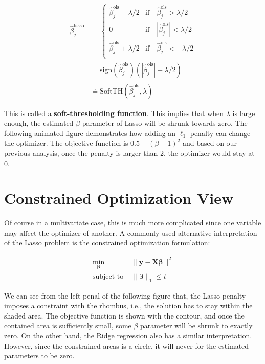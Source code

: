 \documentclass[
]{book}
\theoremstyle{definition}
\theoremstyle{definition}
\theoremstyle{definition}
\theoremstyle{definition}
\theoremstyle{remark}
\begin{document}
\begin{align}
\hat\beta_j^\text{lasso} &=
        \begin{cases}
        \hat\beta_j^\text{ols} - \lambda/2 & \text{if} \quad \hat\beta_j^\text{ols} > \lambda/2 \\
        0 & \text{if} \quad |\hat\beta_j^\text{ols}| < \lambda/2 \\
        \hat\beta_j^\text{ols} + \lambda/2 & \text{if} \quad \hat\beta_j^\text{ols} < -\lambda/2 \\
        \end{cases}\\
        &= \text{sign}(\hat\beta_j^\text{ols}) \left(|\hat\beta_j^\text{ols}| - \lambda/2 \right)_+ \\
        &\doteq \text{SoftTH}(\hat\beta_j^\text{ols}, \lambda)
\end{align}

This is called a \textbf{soft-thresholding function}. This implies that when \(\lambda\) is large enough, the estimated \(\beta\) parameter of Lasso will be shrunk towards zero. The following animated figure demonstrates how adding an \(\ell_1\) penalty can change the optimizer. The objective function is \(0.5 + (\beta - 1)^2\) and based on our previous analysis, once the penalty is larger than 2, the optimizer would stay at 0.

\hypertarget{constrained-optimization-view}{%
\section{Constrained Optimization View}\label{constrained-optimization-view}}

Of course in a multivariate case, this is much more complicated since one variable may affect the optimizer of another. A commonly used alternative interpretation of the Lasso problem is the constrained optimization formulation:

\begin{align}
\min_{\boldsymbol \beta} \,\,& \lVert \mathbf{y}- \mathbf{X}\boldsymbol \beta\rVert^2\\
\text{subject to} \,\, & \lVert\boldsymbol \beta\rVert_1 \leq t
\end{align}

We can see from the left penal of the following figure that, the Lasso penalty imposes a constraint with the rhombus, i.e., the solution has to stay within the shaded area. The objective function is shown with the contour, and once the contained area is sufficiently small, some \(\beta\) parameter will be shrunk to exactly zero. On the other hand, the Ridge regression also has a similar interpretation. However, since the constrained areas is a circle, it will never for the estimated parameters to be zero.
\end{document}

